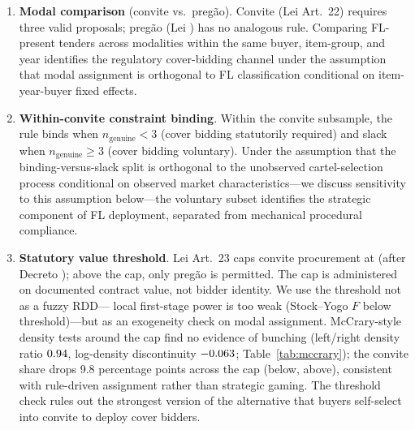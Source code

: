 \begin{enumerate}
\item \textbf{Modal comparison} (convite vs.\ pregão).
Convite (Lei \valLeiOriginal Art.\ 22) requires three valid proposals;
pregão (Lei \valLeiPregao) has no analogous rule. Comparing
FL-present tenders across modalities within the same buyer,
item-group, and year identifies the regulatory cover-bidding
channel under the assumption that modal assignment is
orthogonal to FL classification conditional on item-year-buyer
fixed effects.
\item \textbf{Within-convite constraint binding}. Within the
convite subsample, the rule binds when $n_{\text{genuine}} < 3$
(cover bidding statutorily required) and slack when
$n_{\text{genuine}} \geq 3$ (cover bidding voluntary). Under
the assumption that the binding-versus-slack split is
orthogonal to the unobserved cartel-selection process
conditional on observed market characteristics---we discuss
sensitivity to this assumption below---the
voluntary subset identifies the strategic component of FL
deployment, separated from mechanical procedural compliance.
\item \textbf{Statutory value threshold}. Lei \valLeiOriginal Art.\ 23
caps convite procurement at \valCapOldR (\valCapNewR after
Decreto \valDecreto); above the cap, only pregão is permitted.
The cap is administered on documented contract value, not
bidder identity. We use the threshold not as a fuzzy RDD---
local first-stage power is too weak (Stock--Yogo $F$ below
threshold)---but as an exogeneity check on modal assignment.
McCrary-style density tests around the \valCapOldR cap find no
evidence of bunching (left/right density ratio $0.94$,
log-density discontinuity $-0.063$;
Table~\ref{tab:mccrary}); the convite share drops 9.8
percentage points across the cap (\valPctSixnine below, \valPctFifnine above),
consistent with rule-driven assignment rather than strategic
gaming. The threshold check rules out the strongest version of
the alternative that buyers self-select into convite to deploy
cover bidders.
\end{enumerate}

